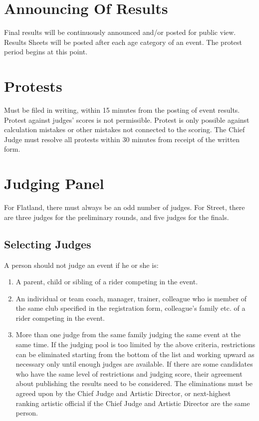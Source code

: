\section{Announcing Of Results}
Final results will be continuously announced and/or posted for public view.
Results Sheets will be posted after each age category of an event.
The protest period begins at this point.

\section{Protests}
Must be filed in writing, within 15 minutes from the posting of event results.
Protest against judges' scores is not permissible.
Protest is only possible against calculation mistakes or other mistakes not connected to the scoring.
The Chief Judge must resolve all protests within 30 minutes from receipt of the written form.

\section{Judging Panel}
For Flatland, there must always be an odd number of judges.
For Street, there are three judges for the preliminary rounds, and five judges for the finals.

\subsection{Selecting Judges}
A person should not judge an event if he or she is:
\begin{enumerate}
\item A parent, child or sibling of a rider competing in the event.
\item An individual or team coach, manager, trainer, colleague who is member of the same club specified in the registration form, colleague's family etc. of a rider competing in the event.
\item More than one judge from the same family judging the same event at the same time.
If the judging pool is too limited by the above criteria, restrictions can be eliminated starting from the bottom of the list and working upward as necessary only until enough judges are available.
If there are some candidates who have the same level of restrictions and judging score, their agreement about publishing the results need to be considered.
The eliminations must be agreed upon by the Chief Judge and Artistic Director, or next-highest ranking artistic official if the Chief Judge and Artistic Director are the same person.
\end{enumerate}

